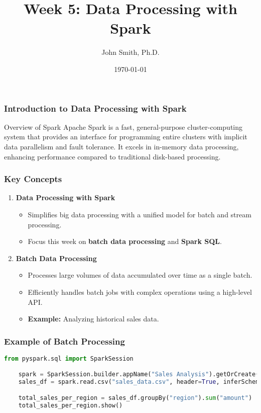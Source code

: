 \documentclass[aspectratio=169]{beamer}
\title[Week 5: Data Processing with Spark]{Week 5: Data Processing with Spark}
\author[J. Smith]{John Smith, Ph.D.}
\institute[University Name]{
  Department of Computer Science\\
  University Name\\
  \vspace{0.3cm}
  Email: email@university.edu\\
  Website: www.university.edu
}
\date{\today}
\begin{document}
\frame{\titlepage}

\begin{frame}[fragile]
    \frametitle{Introduction to Data Processing with Spark}
    \begin{block}{Overview of Spark}
        Apache Spark is a fast, general-purpose cluster-computing system that provides an interface for programming entire clusters with implicit data parallelism and fault tolerance. It excels in in-memory data processing, enhancing performance compared to traditional disk-based processing.
    \end{block}
\end{frame}

\begin{frame}[fragile]
    \frametitle{Key Concepts}
    \begin{enumerate}
        \item \textbf{Data Processing with Spark}
        \begin{itemize}
            \item Simplifies big data processing with a unified model for batch and stream processing.
            \item Focus this week on \textbf{batch data processing} and \textbf{Spark SQL}.
        \end{itemize}

        \item \textbf{Batch Data Processing}
        \begin{itemize}
            \item Processes large volumes of data accumulated over time as a single batch.
            \item Efficiently handles batch jobs with complex operations using a high-level API.
            \item \textbf{Example:} Analyzing historical sales data.
        \end{itemize}
    \end{enumerate}
\end{frame}

\begin{frame}[fragile]
    \frametitle{Example of Batch Processing}
    \begin{lstlisting}[language=Python]
    from pyspark.sql import SparkSession

    spark = SparkSession.builder.appName("Sales Analysis").getOrCreate()
    sales_df = spark.read.csv("sales_data.csv", header=True, inferSchema=True)

    total_sales_per_region = sales_df.groupBy("region").sum("amount")
    total_sales_per_region.show()
    \end{lstlisting}
\end{frame}
\end{document}
